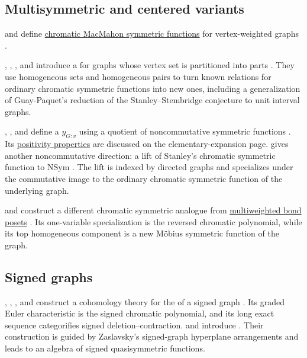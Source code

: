 \subsection[chromaticWeightedVariants]{Multisymmetric and centered variants}

 and  define
\hyperref[extendedChromatic]{chromatic MacMahon symmetric functions} for
vertex-weighted graphs \cite{MartinTrist2025x}.

, , , and
 introduce a
\label{chromaticMultisymmetricFunction}
for graphs whose vertex set is partitioned into parts
\cite{CrewHaithcockReynesSpirkl2024}.
They use homogeneous sets and homogeneous pairs to turn known relations for
ordinary chromatic symmetric functions into new ones, including a
generalization of Guay-Paquet's reduction of the Stanley--Stembridge
conjecture to unit interval graphs.

, , and
 define a
\label{centeredChromaticSymmetricFunction}
$y_{G:v}$ using a quotient of noncommutative symmetric functions
\cite{AliniaeifardWangWilligenburg2024}. Its
\hyperref[chromaticECenteredPositivity]{positivity properties} are discussed
on the elementary-expansion page.
 gives another noncommutative direction: a lift of
Stanley's chromatic symmetric function to
\hyperref[nonComFunctions]{$\mathrm{NSym}$} \cite{Campbell2024x}.  The lift
is indexed by directed graphs and specializes under the commutative image to
the ordinary chromatic symmetric function of the underlying graph.

 and  construct a
different chromatic symmetric analogue from
\hyperref[weightedBondSymmetric]{multiweighted bond posets}
\cite{DLeonWachs2026x}.  Its one-variable specialization is the reversed
chromatic polynomial, while its top homogeneous component is a new Möbius
symmetric function of the graph.


\subsection[chromaticSignedVariants]{Signed graphs}

, , , and
 construct a cohomology theory for the
\label{signedChromaticPolynomial}
of a signed graph \cite{ChengLeiWangZhang2022}.  Its graded Euler
characteristic is the signed chromatic polynomial, and its long exact sequence
categorifies signed deletion--contraction.
 and  introduce
\label{signedChromaticQuasisymmetricFunction}
\cite{AvalMelgar2025x}.  Their
construction is guided by Zaslavsky's signed-graph hyperplane arrangements and
leads to an algebra of signed quasisymmetric functions.


